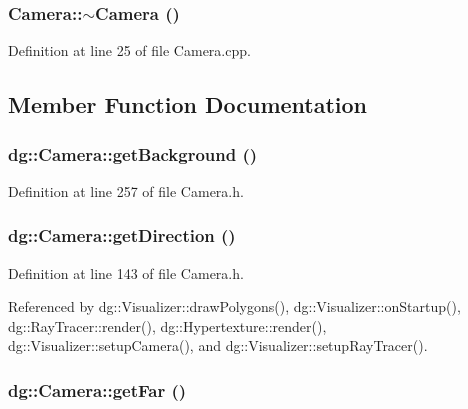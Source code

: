 \subsubsection{\setlength{\rightskip}{0pt plus 5cm}Camera::$\sim$Camera ()}\label{classdg_1_1Camera_a1}




Definition at line 25 of file Camera.cpp.

\subsection{Member Function Documentation}
\subsubsection{ dg::Camera::get\-Background ()\hspace{0.3cm}{\tt  [inline]}}\label{classdg_1_1Camera_a24}




Definition at line 257 of file Camera.h.
\subsubsection{ dg::Camera::get\-Direction ()\hspace{0.3cm}{\tt  [inline]}}\label{classdg_1_1Camera_a5}




Definition at line 143 of file Camera.h.

Referenced by dg::Visualizer::draw\-Polygons(), dg::Visualizer::on\-Startup(), dg::Ray\-Tracer::render(), dg::Hypertexture::render(), dg::Visualizer::setup\-Camera(), and dg::Visualizer::setup\-Ray\-Tracer().
\subsubsection{ dg::Camera::get\-Far ()\hspace{0.3cm}{\tt  [inline]}}\label{classdg_1_1Camera_a14}




